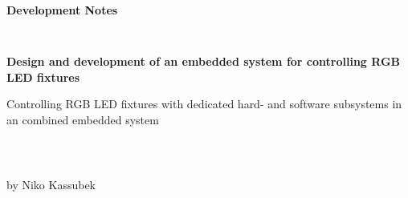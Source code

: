 \thispagestyle{empty}
\begin{verbatim}


\end{verbatim}

\begin{center}
\large{\textbf{ Development Notes }}

\end{center}

\begin{verbatim}


\end{verbatim}

\begin{center}
	\makebox[\linewidth]{\rule{\linewidth}{0.4pt}}
\end{center}


\begin{center}
	
	\textbf{\LARGE Design and development of an embedded system for controlling RGB LED fixtures}
\end{center}

\begin{center}
	 \large Controlling RGB LED fixtures with dedicated hard- and software subsystems in an combined embedded system
	  \makebox[\linewidth]{\rule{\linewidth}{0.4pt}}
\end{center}

\begin{verbatim}
	
	
\end{verbatim}

\begin{center}
	by Niko Kassubek
\end{center}
